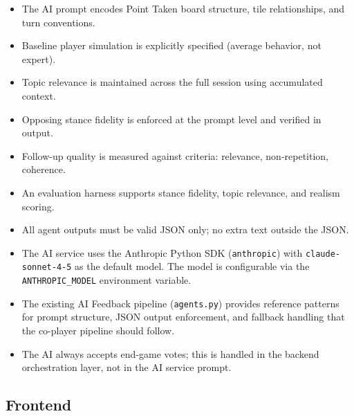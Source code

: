 \documentclass[11pt]{article}
\begin{document}
\begin{itemize}
  \item The AI prompt encodes Point Taken board structure, tile relationships, and turn conventions.
  \item Baseline player simulation is explicitly specified (average behavior, not expert).
  \item Topic relevance is maintained across the full session using accumulated context.
  \item Opposing stance fidelity is enforced at the prompt level and verified in output.
  \item Follow-up quality is measured against criteria: relevance, non-repetition, coherence.
  \item An evaluation harness supports stance fidelity, topic relevance, and realism scoring.
  \item All agent outputs must be valid JSON only; no extra text outside the JSON.
  \item The AI service uses the Anthropic Python SDK (\texttt{anthropic}) with
        \texttt{claude-sonnet-4-5} as the default model. The model is configurable via the
        \texttt{ANTHROPIC\_MODEL} environment variable.
  \item The existing AI Feedback pipeline (\texttt{agents.py}) provides reference patterns for
        prompt structure, JSON output enforcement, and fallback handling that the co-player
        pipeline should follow.
  \item The AI always accepts end-game votes; this is handled in the backend orchestration
        layer, not in the AI service prompt.
\end{itemize}

\subsection{Frontend}
\end{document}
